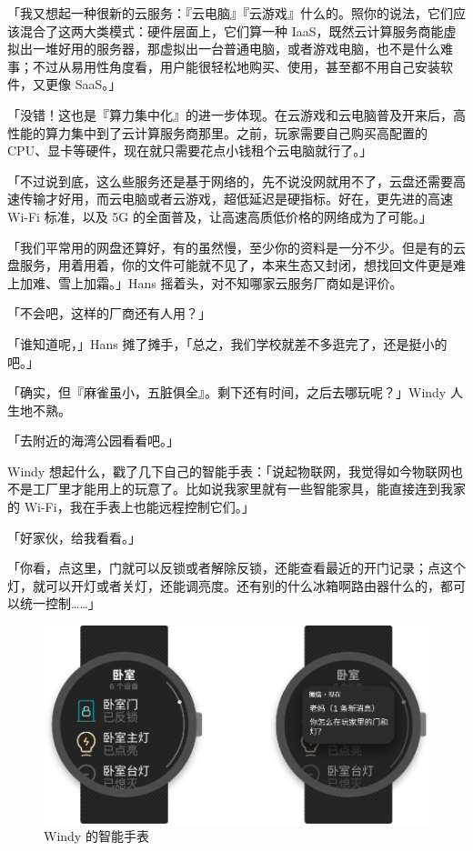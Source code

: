 「我又想起一种很新的云服务：『云电脑』『云游戏』什么的。照你的说法，它们应该混合了这两大类模式：硬件层面上，它们算一种 IaaS，既然云计算服务商能虚拟出一堆好用的服务器，那虚拟出一台普通电脑，或者游戏电脑，也不是什么难事；不过从易用性角度看，用户能很轻松地购买、使用，甚至都不用自己安装软件，又更像 SaaS。」

「没错！这也是『算力集中化』的进一步体现。在云游戏和云电脑普及开来后，高性能的算力集中到了云计算服务商那里。之前，玩家需要自己购买高配置的 CPU、显卡等硬件，现在就只需要花点小钱租个云电脑就行了。」

「不过说到底，这么些服务还是基于网络的，先不说没网就用不了，云盘还需要高速传输才好用，而云电脑或者云游戏，超低延迟是硬指标。好在，更先进的高速 Wi-Fi 标准，以及 5G 的全面普及，让高速高质低价格的网络成为了可能。」

「我们平常用的网盘还算好，有的虽然慢，至少你的资料是一分不少。但是有的云盘服务，用着用着，你的文件可能就不见了，本来生态又封闭，想找回文件更是难上加难、雪上加霜。」Hans 摇着头，对不知哪家云服务厂商如是评价。

「不会吧，这样的厂商还有人用？」

「谁知道呢，」Hans 摊了摊手，「总之，我们学校就差不多逛完了，还是挺小的吧。」

「确实，但『麻雀虽小，五脏俱全』。剩下还有时间，之后去哪玩呢？」Windy 人生地不熟。

「去附近的海湾公园看看吧。」

Windy 想起什么，戳了几下自己的智能手表：「说起物联网，我觉得如今物联网也不是工厂里才能用上的玩意了。比如说我家里就有一些智能家具，能直接连到我家的 Wi-Fi，我在手表上也能远程控制它们。」

「好家伙，给我看看。」

「你看，点这里，门就可以反锁或者解除反锁，还能查看最近的开门记录；点这个灯，就可以开灯或者关灯，还能调亮度。还有别的什么冰箱啊路由器什么的，都可以统一控制……」

\begin{figure}[htb!]
  \centering
  \includegraphics[width=.8\textwidth]{assets/surpass/Smart_watch.pdf}
  \caption{Windy 的智能手表}
  \label{fig:Smart_watch}
\end{figure}

